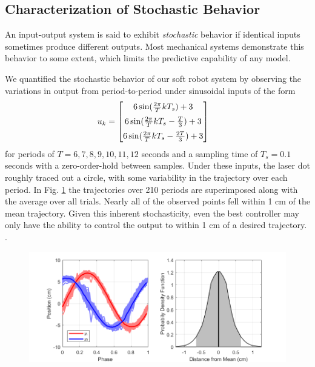 \subsection{Characterization of Stochastic Behavior}
\label{sec:noise}

An input-output system is said to exhibit \emph{stochastic} behavior if identical inputs sometimes produce different outputs.
Most mechanical systems demonstrate this behavior to some extent, which limits the predictive capability of any model.

We quantified the stochastic behavior of our soft robot system by observing the variations in output from period-to-period under sinusoidal inputs of the form
\begin{align}
    u_k &= \begin{bmatrix} 6 \sin ( \frac{2 \pi}{T} k T_s ) + 3 \vspace{5pt} \\ 
    6 \sin ( \frac{2 \pi}{T} k T_s - \frac{T}{3} ) + 3 \vspace{5pt} \\ 
    6 \sin ( \frac{2 \pi}{T} k T_s  - \frac{2T}{3}) + 3\end{bmatrix}
    \label{eq:unoise}
\end{align}
for periods of $T = 6,7,8,9,10,11,12$ seconds and a sampling time of $T_s = 0.1$ seconds with a zero-order-hold between samples. 
Under these inputs, the laser dot roughly traced out a circle, with some variability in the trajectory over each period.
In Fig. \ref{fig:noise} the trajectories over 210 periods are superimposed along with the average over all trials.
Nearly all of the observed points fell within 1 cm of the mean trajectory.
Given this inherent stochasticity, even the best controller may only have the ability to control the output to within 1 cm of a desired trajectory. .

\begin{figure}
    \centering
    \includegraphics[width=\linewidth]{figures/noise_ph.png}
    \caption{}
    \label{fig:noise}
\end{figure}

